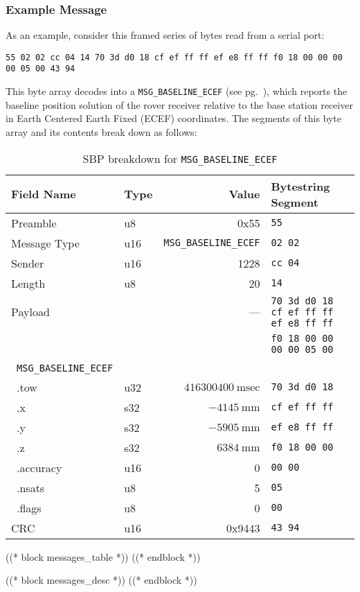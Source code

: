 \documentclass{article}
\numberwithin{table}{subsection}
\numberwithin{field}{subsection}
\begin{document}
\subsubsection*{Example Message}
\begin{large}
 \par As an example, consider this framed series of bytes read from a
 serial port:
\begin{verbatim}
55 02 02 cc 04 14 70 3d d0 18 cf ef ff ff ef e8 ff ff f0 18 00 00 00 00 05 00 43 94
\end{verbatim}
This byte array decodes into a \texttt{MSG\_BASELINE\_ECEF} (see
pg.~\pageref{sec:MSG_POS_ECEF}), which reports the baseline position
solution of the rover receiver relative to the base station receiver
in Earth Centered Earth Fixed (ECEF) coordinates. The segments of this
byte array and its contents break down as follows:
\end{large}
\begin{table}[h]
  \centering
  \begin{tabular}{llrl}
    \toprule
    Field Name & Type & Value & Bytestring Segment\\
    \midrule
    {Preamble} & u8 & 0x55 & \verb!55! \\
    {Message Type}& u16 & \texttt{MSG\_BASELINE\_ECEF} & \verb!02 02! \\
    {Sender}& u16 & 1228 & \verb!cc 04! \\
    {Length}& u8 & 20 &  \verb!14! \\
    {Payload}& & --- & \verb!70 3d d0 18 cf ef ff ff ef e8 ff ff! \\
    & & & \verb!f0 18 00 00 00 00 05 00! \\
    \quad~\texttt{MSG\_BASELINE\_ECEF} & & & \\
    \quad~.tow & u32 & $416300400~\textrm{msec}$  & \verb!70 3d d0 18! \\
    \quad~.x & s32 & $-4145~\textrm{mm}$  & \verb!cf ef ff ff! \\
    \quad~.y & s32 & $-5905~\textrm{mm}$  & \verb!ef e8 ff ff! \\
    \quad~.z & s32 & $6384~\textrm{mm}$  & \verb!f0 18 00 00! \\
    \quad~.accuracy & u16 & 0 & \verb!00 00! \\
    \quad~.nsats & u8 & 5 & \verb!05! \\
    \quad~.flags & u8 & 0 & \verb!00! \\
    {CRC} & u16 & 0x9443 & \verb!43 94! \\
    \bottomrule
  \end{tabular}
  \caption{SBP breakdown for \texttt{MSG\_BASELINE\_ECEF}}
  \label{tab:example_breakdown}
\end{table}

((* block messages_table *))
((* endblock *))

((* block messages_desc *))
((* endblock *))
\end{document}
